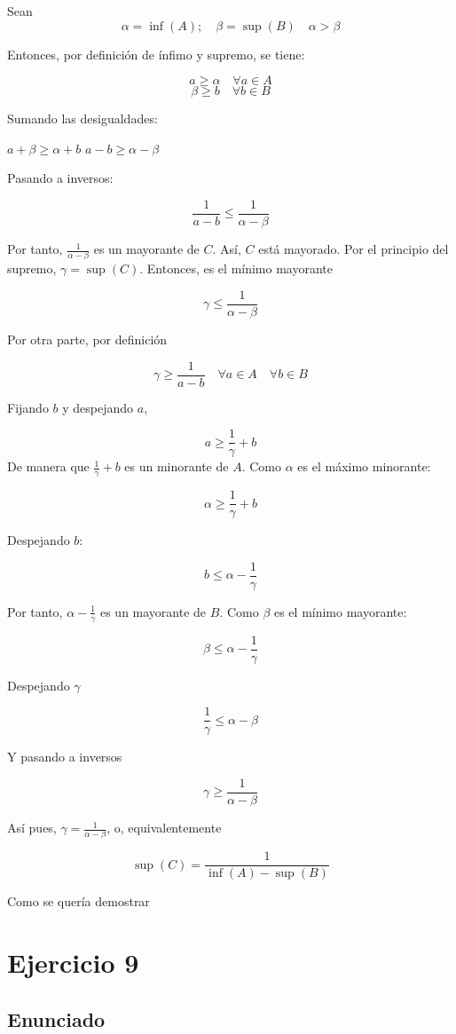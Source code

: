 \documentclass[11pt]{article}
\begin{document}
Sean
\[
\alpha = \inf(A); \quad \beta = \sup(B) \quad \alpha > \beta
\] 

Entonces, por definición de ínfimo y supremo, se tiene:

\[a \geq \alpha \quad \forall a \in A\]
\[\beta \geq b \quad \forall b \in B\]

Sumando las desigualdades:

$a+\beta \geq \alpha + b$
$a-b \geq \alpha - \beta$

Pasando a inversos:

\[
\frac{1}{a-b} \leq \frac{1}{\alpha -\beta}
\]

Por tanto, $\frac{1}{\alpha-\beta}$ es un mayorante de $C$. Así,
$C$ está mayorado. Por el principio del supremo,
$\gamma = \sup(C)$. Entonces, es el mínimo mayorante

\[
\gamma \leq \frac{1}{\alpha-\beta}
\]

Por otra parte, por definición

\[
\gamma \geq \frac{1}{a-b} \quad \forall a \in A \quad \forall b \in B
\]


Fijando $b$ y despejando $a$,

\[
a \geq \frac{1}{\gamma} + b
\]
De manera que $\frac{1}{\gamma} + b$ es un minorante de $A$. Como
$\alpha$ es el máximo minorante:

\[
\alpha \geq \frac{1}{\gamma} + b
\]

Despejando $b$:

\[
b \leq \alpha - \frac{1}{\gamma}
\]

Por tanto, $\alpha - \frac{1}{\gamma}$ es un mayorante de $B$.
Como $\beta$ es el mínimo mayorante:

\[
\beta \leq \alpha - \frac{1}{\gamma}
\]

Despejando $\gamma$

\[
\frac{1}{\gamma} \leq \alpha - \beta
\]

Y pasando a inversos

\[
\gamma \geq \frac{1}{\alpha -\beta}
\]


Así pues, $\gamma = \frac{1}{\alpha-\beta}$, o, equivalentemente


\[
\sup(C) = \frac{1}{\inf(A)-\sup(B)}
\]

Como se quería demostrar

\section{Ejercicio 9}
\label{sec-5}

\subsection{Enunciado}
\label{sec-5-1}
\end{document}
